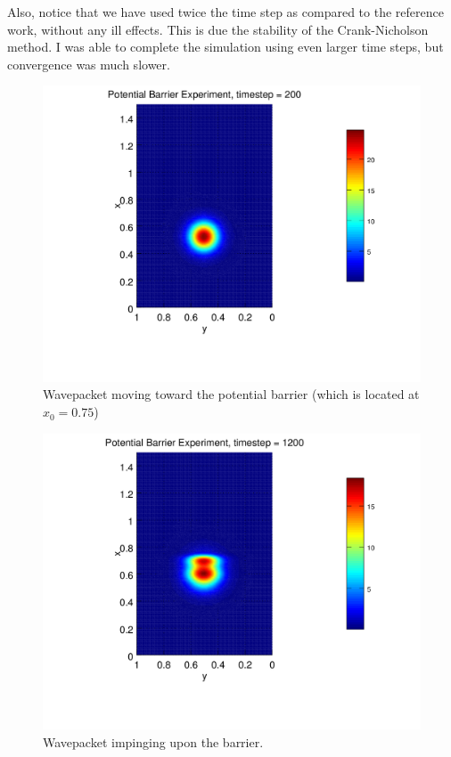 \documentclass[letterpaper,12pt]{article}
\begin{document}
Also, notice that we have used twice the time step as compared to the reference work, without any ill effects.  This is due the stability of the Crank-Nicholson method.  I was able to complete the simulation using even larger time steps, but convergence was much slower. 


\begin{figure}[!htbp]
\centering
\includegraphics[scale=0.65,trim = 2mm 25mm 2mm 15mm]{barrier1.png}
\caption{Wavepacket moving toward the potential barrier (which is located at $x_0 = 0.75$) }
\label{fig:b1}
\end{figure}

\begin{figure}[!htbp]
\centering
\includegraphics[scale=0.65,trim = 2mm 25mm 2mm 15mm]{barrier2.png}
\caption{Wavepacket impinging upon the barrier.}
\label{fig:b2}
\end{figure}
\end{document}
